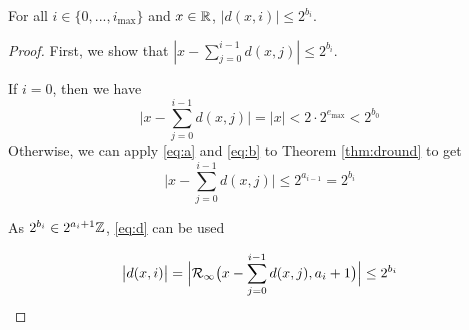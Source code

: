     \begin{samepage}
    \begin{thm}
      For all $i \in \{0, ..., i_{\max}\}$ and $x \in \mathbb{R}$, $|d(x, i)| \leq 2^{b_i}$.
      \label{thm:dbound}
    \end{thm}
    \end{samepage}

    \begin{proof}
      First, we show that $|x - \sum\limits_{j=0}^{i - 1}d(x,j)| \leq 2^{b_i}$.

      If $i = 0$, then we have
      \begin{equation*}
        \bigl|x - \sum\limits_{j=0}^{i - 1}d(x,j)\bigr| = |x| < 2 \cdot 2^{e_{\max}} < 2^{b_0}
      \end{equation*}
      Otherwise, we can apply  \eqref{eq:a} and \eqref{eq:b} to Theorem \ref{thm:dround} to get
      \begin{equation*}
        \bigl|x - \sum \limits_{j = 0}^{i - 1}d(x, j)\bigr| \leq 2^{a_{i - 1}} = 2^{b_i}
      \end{equation*}

      As $2^{b_i} \in 2^{a_i + 1}\mathbb{Z}$,  \eqref{eq:d} can be used

      \begin{equation*}
        \bigl|d(x, i)\bigr| = \Bigl|\mathcal{R}_\text{$\infty$}\bigl(x - \sum\limits_{j=0}^{i - 1}d(x,j), a_i + 1\bigr)\Bigr| \leq 2^{b_i}
      \end{equation*}
    \end{proof}

